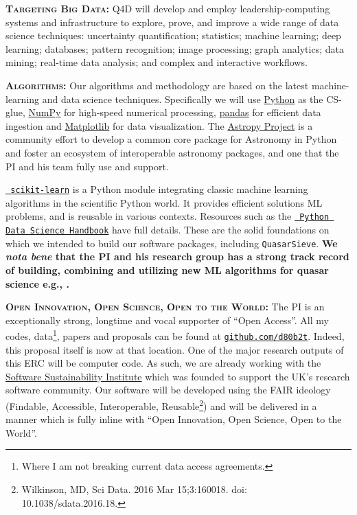 \smallskip
\smallskip
\noindent
\textbf{\textsc{Targeting Big Data: }}
Q4D will develop and employ leadership-computing systems and
infrastructure to explore, prove, and improve a wide range of data
science techniques: uncertainty quantification; statistics; machine
learning; deep learning; databases; pattern recognition; image
processing; graph analytics; data mining; real-time data analysis; and
complex and interactive workflows.


\smallskip
\smallskip
\noindent
\textbf{\textsc{Algorithms: }}
Our algorithms and methodology are based on the latest
machine-learning and data science techniques. Specifically we will use
\href{https://www.python.org/}{Python} as the CS-glue,
\href{http://www.numpy.org/}{NumPy} for high-speed numerical
processing, \href{https://pandas.pydata.org/}{pandas} for efficient
data ingestion and \href{https://matplotlib.org/}{Matplotlib} for data
visualization.  The \href{http://www.astropy.org/}{Astropy Project} is
a community effort to develop a common core package for Astronomy in
Python and foster an ecosystem of interoperable astronomy packages,
and one that the PI and his team fully use and support.

\smallskip
\smallskip
\noindent
\href{http://ogrisel.github.io/scikit-learn.org/sklearn-tutorial/index.html}{\tt
scikit-learn} is a Python module integrating classic machine learning
algorithms in the scientific Python world. It provides efficient solutions 
ML problems, and is reusable in various contexts. Resources such as the
\href{https://github.com/jakevdp/PythonDataScienceHandbook}{{\tt
Python Data Science Handbook}} have full details.  
These are the solid foundations on which we
intended to build our software packages, including {\tt QuasarSieve}.
\textbf{We \emph{nota bene} that the PI and his research group has a strong
track record of building, combining and utilizing new ML algorithms
for quasar science e.g., \citet{Ross2012}.}

\smallskip
\smallskip
\noindent



\smallskip
\smallskip
\noindent
\textbf{\textsc{Open Innovation, Open Science, Open to the World:}}
The PI is an exceptionally strong, longtime and vocal supporter of
``Open Access''.  All my codes, data\footnote{Where I am not breaking
current data access agreements.}, papers and proposals can be found at
\href{github.com/d80b2t}{{\tt github.com/d80b2t}}.  Indeed, this
proposal itself is now at that location.  One of the major research
outputs of this ERC will be computer code.  As such, we are already
working with the \href{\tt https://www.software.ac.uk/}{Software
Sustainability Institute} which was founded to support the UK's
research software community.  Our software will be developed using the
FAIR ideology (Findable, Accessible, Interoperable,
Reusable\footnote{Wilkinson, MD, Sci Data. 2016 Mar 15;3:160018. doi:
10.1038/sdata.2016.18.})  and will be delivered in a manner which is
fully inline with ``Open Innovation, Open Science, Open to the
World''.

